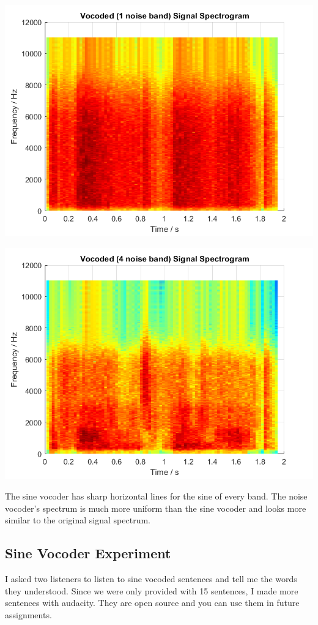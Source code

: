 \documentclass[11pt]{article}
\begin{document}
\includegraphics[width=\textwidth]{output/vocoded_1noise_spectrogram.png}

\includegraphics[width=\textwidth]{output/vocoded_4noise_spectrogram.png}

The sine vocoder has sharp horizontal lines for the sine of every band.
The noise vocoder's spectrum is much more uniform than the sine vocoder and looks more
similar to the original signal spectrum.

\subsection{Sine Vocoder Experiment}

I asked two listeners to listen to sine vocoded sentences and tell
me the words they understood.
Since we were only provided with 15 sentences, I made more sentences with audacity.
They are open source and you can use them in future assignments.\\
\end{document}
